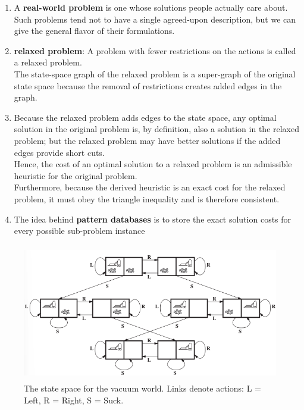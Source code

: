 \begin{enumerate}
    \item A \textbf{real-world problem} is one whose solutions people actually care about.\\
    Such problems tend not to have a single agreed-upon description, but we can give the general flavor of their formulations.

    \item \textbf{relaxed problem}: A problem with fewer restrictions on the actions is called a relaxed problem.\\
    The state-space graph of the relaxed problem is a super-graph of the original state space because the removal of restrictions creates added edges in the graph.

    \item Because the relaxed problem adds edges to the state space, any optimal solution in the original problem is, by definition, also a solution in the relaxed problem; but the relaxed problem may have better solutions if the added edges provide short cuts.\\
    Hence, the cost of an optimal solution to a relaxed problem is an admissible heuristic for the original problem.\\
    Furthermore, because the derived heuristic is an exact cost for the relaxed problem, it must obey the triangle inequality and is therefore consistent.

    \item The idea behind \textbf{pattern databases} is to store the exact solution costs for every possible sub-problem instance
\end{enumerate}

\begin{figure}[H]
    \centering
    \includegraphics[width=\linewidth, height=6cm, keepaspectratio]{Pictures/ai-ml/vaccum-toy-states.png}
    \caption*{The state space for the vacuum world. Links denote actions: L = Left, R = Right, S = Suck.}
\end{figure}

